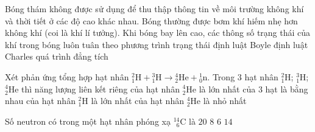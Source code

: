 	\begin{ex}%
		Bóng thám không được sử dụng để thu thập thông tin về môi trường không khí và thời tiết ở các độ cao khác nhau. Bóng thường được bơm khí hiếm nhẹ hơn không khí (coi là khí lí tưởng). Khi bóng bay lên cao, các thông số trạng thái của khí trong bóng luôn tuân theo
		\choice
		{\True phương trình trạng thái}
		{định luật Boyle}
		{định luật Charles}
		{quá trình đẳng tích}
	\end{ex}

	\begin{ex}%
		Xét phản ứng tổng hợp hạt nhân ${}^2_1\text{H}+{}^3_1\text{H}\to{}^4_2\text{He}+{}^1_0\text{n}$. Trong $3$ hạt nhân ${}^2_1\text{H}$; ${}^3_1\text{H}$; ${}^4_2\text{He}$ thì năng lượng liên kết riêng
		\choice
		{\True của hạt nhân ${}^4_2\text{He}$ là lớn nhất}
		{của $3$ hạt là bằng nhau}
		{của hạt nhân ${}^2_1\text{H}$ là lớn nhất}
		{của hạt nhân ${}^4_2\text{He}$ là nhỏ nhất}
	\end{ex}

	\begin{ex}%
		Số neutron có trong một hạt nhân phóng xạ ${}^{14}_{\phantom{1}6}\text{C}$ là
		\choice
		{$20$}
		{\True $8$}
		{$6$}
		{$14$}
	\end{ex}

